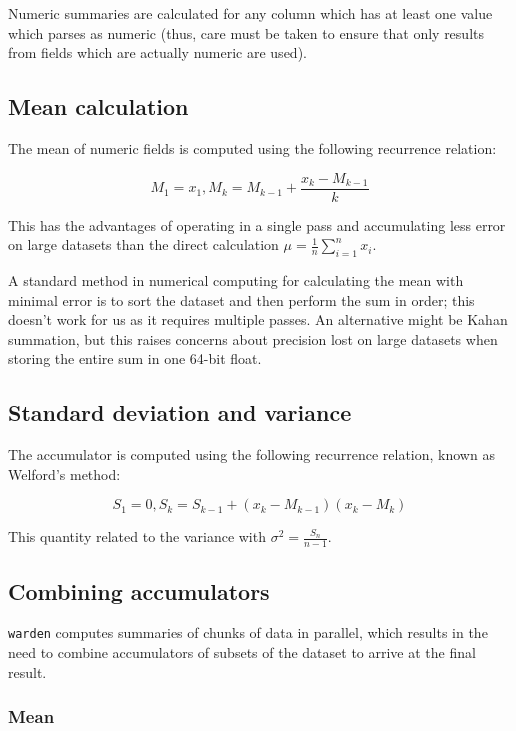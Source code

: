 \documentclass[a4paper]{article}
\begin{document}
Numeric summaries are calculated for any column which has at least one
value which parses as numeric (thus, care must be taken to ensure that
only results from fields which are actually numeric are used).

\subsection{Mean calculation}\label{mean-calculation}

The mean of numeric fields is computed using the following recurrence
relation\cite[pp.~232]{Knuth1997}:

\[M_1 = x_1, M_k = M_{k-1} + \frac{x_k - M_{k-1}}{k}\]

This has the advantages of operating in a single pass and accumulating
less error on large datasets than the direct calculation
\(\mu = \frac{1}{n} \sum\limits_{i=1}^n x_i\).

A standard method in numerical computing for calculating the mean with
minimal error is to sort the dataset and then perform the sum in order;
this doesn't work for us as it requires multiple passes. An alternative
might be Kahan summation\cite{Kahan1965}, but this raises concerns about
precision lost on large datasets when storing the entire sum in one
64-bit float.

\subsection{Standard deviation and
variance}\label{standard-deviation-and-variance}

The accumulator is computed using the following recurrence relation\cite[pp.~232]{Knuth1997}, known as Welford's method\cite{welford1962}:

\[S_1 = 0, S_k = S_{k-1} + (x_k - M_{k-1})(x_k - M_k)\]

This quantity related to the variance with
\(\sigma^2 = \frac{S_n}{n-1}\).

\subsection{Combining accumulators}\label{combining-accumulators}

\texttt{warden} computes summaries of chunks of data in parallel, which results
in the need to combine accumulators of subsets of the dataset to arrive
at the final result.

\subsubsection{Mean}\label{mean}
\end{document}
